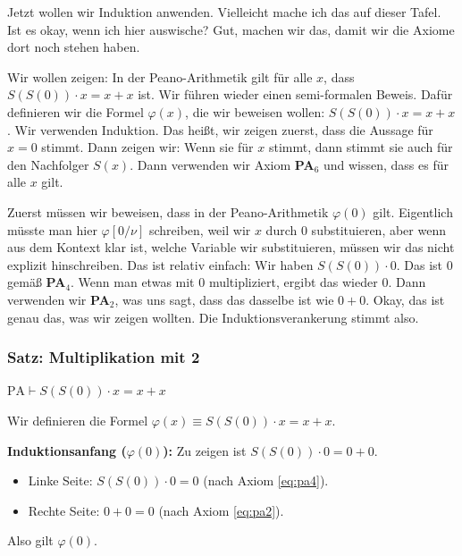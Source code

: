 \begin{spoken-clean}[00:24:50 - 00:28:30]
Jetzt wollen wir Induktion anwenden. Vielleicht mache ich das auf dieser Tafel. Ist es okay, wenn ich hier auswische? Gut, machen wir das, damit wir die Axiome dort noch stehen haben.

Wir wollen zeigen: In der Peano-Arithmetik gilt für alle $x$, dass $S(S(0)) \cdot x = x + x$ ist. Wir führen wieder einen semi-formalen Beweis. Dafür definieren wir die Formel $\varphi(x)$, die wir beweisen wollen: $S(S(0)) \cdot x = x + x$. Wir verwenden Induktion. Das heißt, wir zeigen zuerst, dass die Aussage für $x = 0$ stimmt. Dann zeigen wir: Wenn sie für $x$ stimmt, dann stimmt sie auch für den Nachfolger $S(x)$. Dann verwenden wir Axiom \textbf{PA$_6$} und wissen, dass es für alle $x$ gilt.

Zuerst müssen wir beweisen, dass in der Peano-Arithmetik $\varphi(0)$ gilt. Eigentlich müsste man hier $\varphi[0/\nu]$ schreiben, weil wir $x$ durch $0$ substituieren, aber wenn aus dem Kontext klar ist, welche Variable wir substituieren, müssen wir das nicht explizit hinschreiben. Das ist relativ einfach: Wir haben $S(S(0)) \cdot 0$. Das ist $0$ gemäß \textbf{PA$_4$}. Wenn man etwas mit $0$ multipliziert, ergibt das wieder $0$. Dann verwenden wir \textbf{PA$_2$}, was uns sagt, dass das dasselbe ist wie $0 + 0$. Okay, das ist genau das, was wir zeigen wollten. Die Induktionsverankerung stimmt also.
\end{spoken-clean}

\subsubsection{Satz: Multiplikation mit 2}
\begin{math-stroke}
\begin{proposition}
    \label{prop:2x_is_xx}
    $\text{PA} \vdash S(S(0)) \cdot x = x + x$
\end{proposition}

\begin{short-proof}
Wir definieren die Formel $\varphi(x) \equiv S(S(0)) \cdot x = x + x$.

\textbf{Induktionsanfang ($\varphi(0)$):}
Zu zeigen ist $S(S(0)) \cdot 0 = 0 + 0$.
\begin{itemize}
    \item Linke Seite: $S(S(0)) \cdot 0 = 0$ (nach Axiom \ref{eq:pa4}).
    \item Rechte Seite: $0 + 0 = 0$ (nach Axiom \ref{eq:pa2}).
\end{itemize}
Also gilt $\varphi(0)$.
\end{short-proof}
\end{math-stroke}

